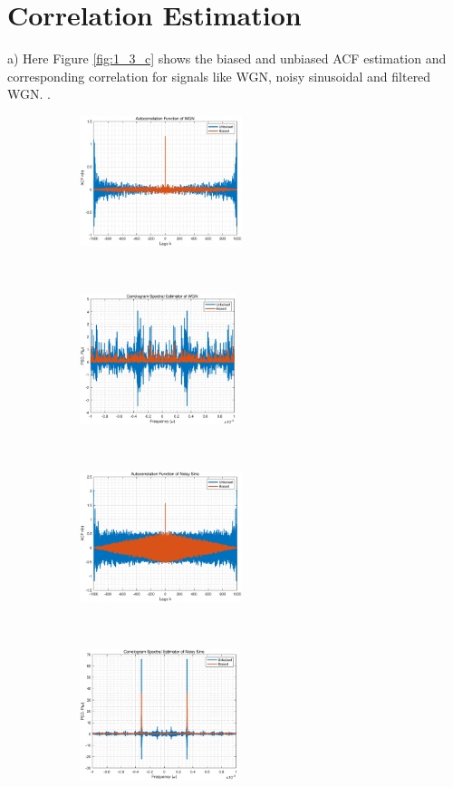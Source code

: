 \section{Correlation Estimation}
a)
Here Figure \ref{fig:1_3_c} shows the biased and unbiased ACF estimation and corresponding correlation for signals like WGN, noisy sinusoidal and filtered WGN. .  
\begin{figure}[H]
    \centering
    \begin{subfigure}{0.35\textwidth}
        \centering
        \includegraphics[height=1.5in]{Part1/1_3_a_1.eps}
    \end{subfigure}
    ~
    \begin{subfigure}{0.35\textwidth}
        \centering
        \includegraphics[height=1.5in]{Part1/1_3_a_2.eps}
    \end{subfigure}
    ~
    ~
    \begin{subfigure}{0.35\textwidth}
        \centering
        \includegraphics[height=1.5in]{Part1/1_3_a_nosiy1.eps}
    \end{subfigure}
    ~ 
    \begin{subfigure}{0.35\textwidth}
        \centering
        \includegraphics[height=1.5in]{Part1/1_3_a_nosiy2.eps}

\end{subfigure}
\end{figure}
